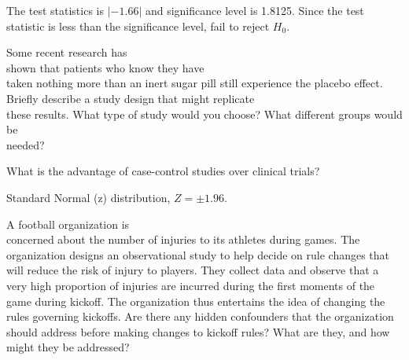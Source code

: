 \documentclass[11pt, chapterprefix=true]{scrbook}\usepackage[]{graphicx}\usepackage[]{color}
\begin{document}
\begin{exercises}
\begin{exercise}
    \end{exercise}
    \begin{solution}  %

The test statistics is $|-1.66|$ and significance level is 1.8125.  Since the test statistic is less than the significance level, fail to reject $H_0$.
    \end{solution}

  \begin{exercise} %

Some recent research has \\ shown that patients who know they have \\ taken nothing more than an inert sugar pill still experience the placebo effect. Briefly describe a study design that might replicate \\ these results. What type of study would you choose? What different groups would be \\ needed?



  \end{exercise}

  \begin{exercise} %

What is the advantage of case-control studies over clinical trials?

  \end{exercise}
  \begin{solution}  %


    Standard Normal (z) distribution, $Z = \pm 1.96$.
  \end{solution}

  \begin{exercise} %

A football organization is \\ concerned about the number of injuries to its athletes during games. The organization designs an observational study to help decide on rule changes that will reduce the risk of injury to players. They collect data and observe that a very high proportion of injuries are incurred during the first moments of the game during kickoff. The organization thus entertains the idea of changing the rules governing kickoffs. Are there any hidden confounders that the organization should address before making changes to kickoff rules? What are they, and how might they be addressed?


\end{exercise}
\end{exercises}
\end{document}
